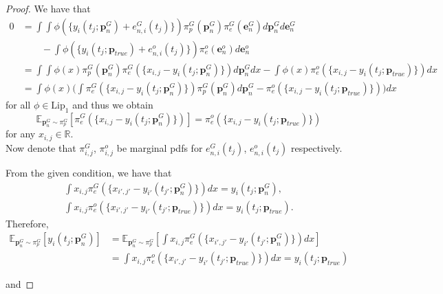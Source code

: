 \documentclass[10pt,a4paper]{amsart}
\begin{document}
\begin{proof}We have that
\begin{align*}
0 &= \int\int \phi(\{y_{i}(t_{j};\mathbf{p}_{n}^{G})+e_{n,i}^{G}(t_{j})\})\pi_{p}^{G}(\mathbf{p}_{n}^{G})
\pi_{e}^{G}(\mathbf{e}_{n}^{G})d\mathbf{p}_{n}^{G}d\mathbf{e}_{n}^{G}\\
 & \quad\quad -\int \phi(\{y_{i}(t_{j};\mathbf{p}_{true})+e_{n,i}^{o}(t_{j})\})\pi_{e}^{o}(\mathbf{e}_{n}^{o})d\mathbf{e}_{n}^{o} \\ 
&= \int\int \phi(x)\pi_{p}^{G}(\mathbf{p}_{n}^{G})\pi_{e}^{G}(\{x_{i,j}-y_{i}(t_{j};\mathbf{p}_{n}^{G})\})d\mathbf{p}_{n}^{G}dx-
\int \phi(x)\pi_{e}^{o}(\{x_{i,j}-y_{i}(t_{j};\mathbf{p}_{true})\})dx \\ &=\int \phi(x)\Bigg(
\int \pi_{e}^{G}(\{x_{i,j}-y_{i}(t_{j};\mathbf{p}_{n}^{G})\})\pi_{p}^{G}(\mathbf{p}_{n}^{G})d\mathbf{p}_{n}^{G}-\pi_{e}^{o}(\{x_{i,j}-y_{i}(t_{j};\mathbf{p}_{true})\})\Bigg)dx \end{align*} for all $\phi \in \text{Lip}_{1}$
and thus we obtain 
\[\mathbb{E}_{\mathbf{p}_{n}^{G} \sim \pi_{p}^{G}}[\pi_{e}^{G}(\{x_{i,j}-y_{i}(t_{j};\mathbf{p}_{n}^{G})\})]=\pi_{e}^{o}(\{x_{i,j}-y_{i}(t_{j};\mathbf{p}_{true})\})\] for any $x_{i,j} \in \mathbb{R}$. \\
Now denote that $\pi_{i,j}^{G}$, $\pi_{i,j}^{o}$ be marginal pdfs for $e_{n,i}^{G}(t_{j})$, $e_{n,i}^{o}(t_{j})$ respectively.

From the given condition, we have that 
\begin{align*}
    \int x_{i,j}\pi_{e}^{G}(\{x_{i',j'}-y_{i'}(t_{j'};\mathbf{p}_{n}^{G})\})dx = y_{i}(t_{j};\mathbf{p}_{n}^{G}),\\ 
\int x_{i,j}\pi_{e}^{o}(\{x_{i',j'}-y_{i'}(t_{j'};\mathbf{p}_{true})\})dx = y_{i}(t_{j};\mathbf{p}_{true}).
\end{align*}
Therefore,
\begin{align*}
\mathbb{E}_{\mathbf{p}_{n}^{G} \sim \pi_{p}^{G}}[y_{i}(t_{j};\mathbf{p}_{n}^{G})] 
&= \mathbb{E}_{\mathbf{p}_{n}^{G} \sim \pi_{p}^{G}}[\int x_{i,j}\pi_{e}^{G}(\{x_{i',j'}-y_{i'}(t_{j'};\mathbf{p}_{n}^{G})\})dx] \\
&= \int x_{i,j}\pi_{e}^{o}(\{x_{i',j'}-y_{i'}(t_{j'};\mathbf{p}_{true})\})dx = y_{i}(t_{j};\mathbf{p}_{true})
\end{align*} 

and 


\end{proof}
\end{document}
